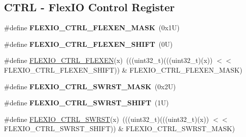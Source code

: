 \subsection*{C\+T\+RL -\/ Flex\+IO Control Register}
\begin{DoxyCompactItemize}
\item 
\mbox{\label{group___f_l_e_x_i_o___register___masks_ga113099c438f48ac5fed027ba4b184509}} 
\#define {\bfseries F\+L\+E\+X\+I\+O\+\_\+\+C\+T\+R\+L\+\_\+\+F\+L\+E\+X\+E\+N\+\_\+\+M\+A\+SK}~(0x1\+U)
\item 
\mbox{\label{group___f_l_e_x_i_o___register___masks_gaf662dd05b7c1775062518ccbd9c1a509}} 
\#define {\bfseries F\+L\+E\+X\+I\+O\+\_\+\+C\+T\+R\+L\+\_\+\+F\+L\+E\+X\+E\+N\+\_\+\+S\+H\+I\+FT}~(0\+U)
\item 
\#define \mbox{\hyperlink{group___f_l_e_x_i_o___register___masks_ga1f7f33ba2f86be83d21b5b1ca65100c8}{F\+L\+E\+X\+I\+O\+\_\+\+C\+T\+R\+L\+\_\+\+F\+L\+E\+X\+EN}}(x)~(((uint32\+\_\+t)(((uint32\+\_\+t)(x)) $<$$<$ F\+L\+E\+X\+I\+O\+\_\+\+C\+T\+R\+L\+\_\+\+F\+L\+E\+X\+E\+N\+\_\+\+S\+H\+I\+FT)) \& F\+L\+E\+X\+I\+O\+\_\+\+C\+T\+R\+L\+\_\+\+F\+L\+E\+X\+E\+N\+\_\+\+M\+A\+SK)
\item 
\mbox{\label{group___f_l_e_x_i_o___register___masks_ga23c49e34471a960faf3f321202059810}} 
\#define {\bfseries F\+L\+E\+X\+I\+O\+\_\+\+C\+T\+R\+L\+\_\+\+S\+W\+R\+S\+T\+\_\+\+M\+A\+SK}~(0x2\+U)
\item 
\mbox{\label{group___f_l_e_x_i_o___register___masks_ga445afdd44419237c7f8872e83f53319a}} 
\#define {\bfseries F\+L\+E\+X\+I\+O\+\_\+\+C\+T\+R\+L\+\_\+\+S\+W\+R\+S\+T\+\_\+\+S\+H\+I\+FT}~(1\+U)
\item 
\#define \mbox{\hyperlink{group___f_l_e_x_i_o___register___masks_ga1bd5a189b39e299660217d0b05472f47}{F\+L\+E\+X\+I\+O\+\_\+\+C\+T\+R\+L\+\_\+\+S\+W\+R\+ST}}(x)~(((uint32\+\_\+t)(((uint32\+\_\+t)(x)) $<$$<$ F\+L\+E\+X\+I\+O\+\_\+\+C\+T\+R\+L\+\_\+\+S\+W\+R\+S\+T\+\_\+\+S\+H\+I\+FT)) \& F\+L\+E\+X\+I\+O\+\_\+\+C\+T\+R\+L\+\_\+\+S\+W\+R\+S\+T\+\_\+\+M\+A\+SK)
\item 
\mbox{\label{group___f_l_e_x_i_o___register___masks_ga27fc541ad74731b6024e12d550bff8f1}} 

\end{DoxyCompactItemize}
